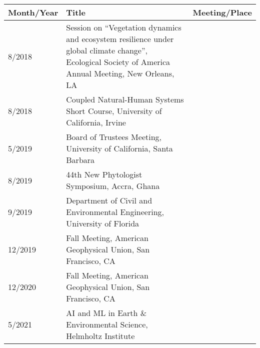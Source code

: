 
\begin{longtable}{lp{10.0cm}p{4.5cm}}
Month/Year & Title & Meeting/Place\\
\hline 
\endhead 
8/2018 & Session on ``Vegetation dynamics and ecosystem resilience under global climate change'', Ecological Society of America Annual Meeting, New Orleans, LA \\
8/2018 & Coupled Natural-Human Systems Short Course, University of California, Irvine \\
5/2019 & Board of Trustees Meeting, University of California, Santa Barbara \\
8/2019 & 44th New Phytologist Symposium, Accra, Ghana \\
9/2019 & Department of Civil and Environmental Engineering, University of Florida \\
12/2019 & Fall Meeting, American Geophysical Union, San Francisco, CA \\
12/2020 & Fall Meeting, American Geophysical Union, San Francisco, CA \\
5/2021 & AI and ML in Earth \& Environmental Science, Helmholtz Institute \\
\end{longtable}

